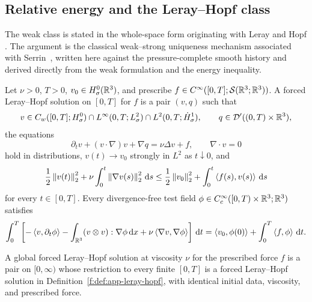 \subsection{Relative energy and the Leray--Hopf class}

The weak class is stated in the whole-space form originating with Leray and
Hopf \cite{Leray1934,Hopf1951}.  The argument is the classical weak--strong
uniqueness mechanism associated with Serrin~\cite{Serrin1962}, written here
against the pressure-complete smooth history and derived directly from the
weak formulation and the energy inequality.

\begin{definition}
\label{f:def:app-leray-hopf}
Let \(\nu>0\), \(T>0\), \(v_0\in H^0_\sigma(\mathbb R^3)\), and prescribe
\(f\in C^\infty([0,T];\mathcal S(\mathbb R^3;\mathbb R^3))\).  A forced
Leray--Hopf solution on \([0,T]\) for \(f\) is a pair \((v,q)\) such that
\[
 v\in C_w([0,T];H^0_\sigma)
 \cap L^\infty(0,T;L^2_\sigma)
 \cap L^2(0,T;\dot H^1_\sigma),
 \qquad
 q\in\mathcal D'((0,T)\times\mathbb R^3),
\]
the equations
\[
 \partial_tv+(v\cdot\nabla)v+\nabla q=\nu\Delta v+f,
 \qquad
 \nabla\cdot v=0
\]
hold in distributions, \(v(t)\to v_0\) strongly in \(L^2\) as
\(t\downarrow0\), and
\begin{equation}
 \frac12\left\lVert v(t)\right\rVert_2^2
 +\nu\int_0^t\left\lVert \nabla v(s)\right\rVert_2^2\,\mathrm d s
 \le\frac12\left\lVert v_0\right\rVert_2^2
 +\int_0^t\left\langle f(s),v(s)\right\rangle\,\mathrm d s
 \label{f:eq:app-leray-energy}
\end{equation}
for every \(t\in[0,T]\).  Every divergence-free test field
\(\phi\in C_c^\infty([0,T)\times\mathbb R^3;\mathbb R^3)\) satisfies
\begin{equation}
 \int_0^T\left[
 -\left\langle v,\partial_t\phi\right\rangle
 -\int_{\mathbb R^3}(v\otimes v):\nabla\phi\,\mathrm d x
 +\nu\left\langle \nabla v,\nabla\phi\right\rangle
 \right]\,\mathrm d t
 =\left\langle v_0,\phi(0)\right\rangle
 +\int_0^T\left\langle f,\phi\right\rangle\,\mathrm d t.
 \label{f:eq:app-leray-weak-form}
\end{equation}
\end{definition}

A global forced Leray--Hopf solution at viscosity \(\nu\) for the
prescribed force \(f\) is a pair on
\([0,\infty)\) whose restriction to every finite \([0,T]\) is a
forced Leray--Hopf solution in Definition~\ref{f:def:app-leray-hopf}, with
identical initial data, viscosity, and prescribed force.

